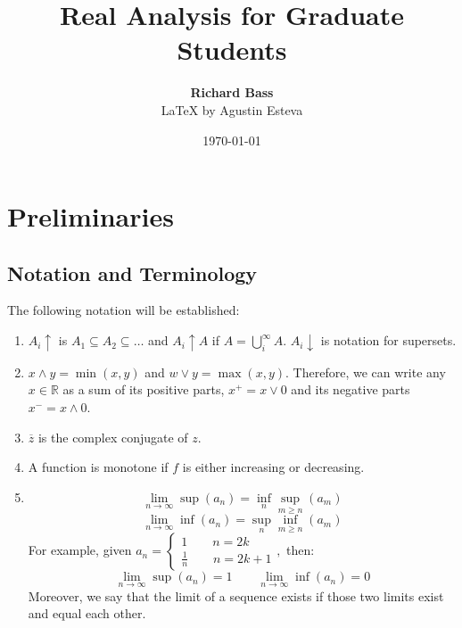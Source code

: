 \documentclass[oneside]{book}
\newcommand{\bbR}{\mathbb{R}}
\def\notetitle{Real Analysis for Graduate
 Students}
\def\noteauthor{
    \textbf{Richard Bass} \\ 
    {\LaTeX} by Agustin Esteva}
\def\notedate{\today}
\begin{document}
\title{\textbf{
    \LARGE{\notetitle} \vspace*{10\baselineskip}}
    }
\author{\noteauthor}
\date{\notedate}

\maketitle
\newpage

\tableofcontents
\newpage


\chapter{Preliminaries}
\section{Notation and Terminology}
The following notation will be established:
\begin{enumerate}
    \item $A_i\uparrow$ is $A_1 \subseteq A_2 \subseteq \dots$ and $A_i \uparrow A$ if $A = \displaystyle\bigcup_i^\infty A.$ $A_i \downarrow$ is notation for supersets.
    \item $x\wedge y = \min(x,y)$ and $w \vee y = \max(x,y).$ Therefore, we can write any $x \in \bbR$ as a sum of its positive parts, $x^+ = x \vee 0$ and its negative parts $x^- = x \wedge 0.$
    \item $\overline{z}$ is the complex conjugate of $z.$
    \item A function is monotone if $f$ is either increasing or decreasing.
    \item \[\lim_{n\to \infty}\sup(a_n) = \inf_n\sup_{m\geq n}(a_m)\]
    \[\lim_{n\to \infty}\inf(a_n) = \sup_n\inf_{m\geq n}(a_m)\]
    For example, given $a_n = \begin{cases}
        1 \qquad n = 2k\\
        \frac{1}{n} \qquad n = 2k+1
    \end{cases},$ then:
    \[\lim_{n\to \infty}\sup(a_n) = 1\qquad \lim_{n\to \infty}\inf(a_n) = 0\] Moreover, we say that the limit of a sequence exists if those two limits exist and equal each other.
\end{enumerate}
\end{document}
